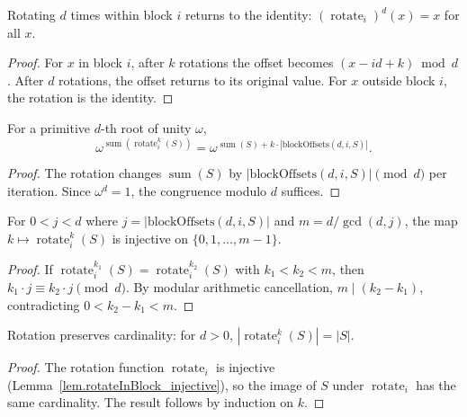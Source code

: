 \begin{lemma}
\label{lem.rotateInBlock_iterate_d}
Rotating $d$ times within block $i$ returns to the identity:
$(\operatorname{rotate}_i)^d(x) = x$ for all $x$.
\end{lemma}

\begin{proof}
For $x$ in block $i$, after $k$ rotations the offset becomes
$(x - id + k) \bmod d$. After $d$ rotations, the offset returns to
its original value. For $x$ outside block $i$, the rotation is the
identity.
\end{proof}

\begin{lemma}
\label{lem.rotateSetInBlockK_sum_pow}
For a primitive $d$-th root of unity $\omega$,
\[
\omega^{\operatorname{sum}(\operatorname{rotate}_i^k(S))}
= \omega^{\operatorname{sum}(S) + k \cdot |\text{blockOffsets}(d, i, S)|}.
\]
\end{lemma}

\begin{proof}
The rotation changes $\operatorname{sum}(S)$ by
$|\text{blockOffsets}(d, i, S)| \pmod{d}$ per iteration. Since
$\omega^d = 1$, the congruence modulo $d$ suffices.
\end{proof}

\begin{lemma}
\label{lem.rotateSetInBlockK_injective}
For $0 < j < d$ where $j = |\text{blockOffsets}(d, i, S)|$ and
$m = d / \gcd(d, j)$, the map
$k \mapsto \operatorname{rotate}_i^k(S)$ is injective on
$\{0, 1, \ldots, m-1\}$.
\end{lemma}

\begin{proof}
If $\operatorname{rotate}_i^{k_1}(S) = \operatorname{rotate}_i^{k_2}(S)$
with $k_1 < k_2 < m$, then $k_1 \cdot j \equiv k_2 \cdot j \pmod{d}$.
By modular arithmetic cancellation, $m \mid (k_2 - k_1)$, contradicting
$0 < k_2 - k_1 < m$.
\end{proof}

\begin{lemma}
\label{lem.rotateSetInBlockK_card}
Rotation preserves cardinality: for $d > 0$,
$|\operatorname{rotate}_i^k(S)| = |S|$.
\end{lemma}

\begin{proof}
The rotation function $\operatorname{rotate}_i$ is injective
(Lemma~\ref{lem.rotateInBlock_injective}), so the image of $S$
under $\operatorname{rotate}_i$ has the same cardinality.
The result follows by induction on $k$.
\end{proof}

